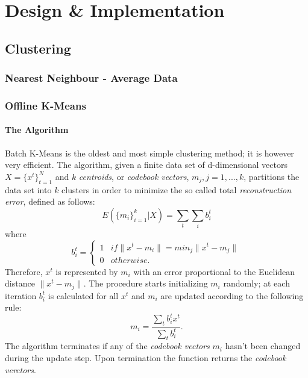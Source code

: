 \documentclass{lmproj}
\begin{document}
\chapter{Design \& Implementation}
\label{design}

\section{Clustering}

\subsection{Nearest Neighbour - Average Data}

\subsection{Offline K-Means}
\subsubsection{The Algorithm}
Batch K-Means is the oldest and most simple clustering method; it is however very efficient. The algorithm, given a finite data set of d-dimensional vectors $X=\{x^t\}_{t=1}^{N}$ and $k$ \textit{centroids}, or \textit{codebook vectors}, $m_j,j=1,...,k$, partitions the data set into $k$ clusters in order to minimize the so called total \textit{reconstruction error}, defined as follows:
\begin{equation}
E(\{m_i\}^k_{i=1}|X)=\underset{t}{\sum}\underset{i}{\sum}b_i^t
\end{equation}
where
\begin{equation}
b_i^t=
\begin{cases}
1 & if \parallel x^t -m_i \parallel = min_j \parallel x^t - m_j \parallel \\
0 & otherwise.
\end{cases}
\end{equation}
Therefore, $x^t$ is represented by $m_i$ with an error proportional to the Euclidean distance $\parallel x^t - m_j \parallel$. The procedure starts initializing $m_i$ randomly; at each iteration $b_i^t$ is calculated for all $x^t$ and $m_i$ are updated according to the following rule:
\begin{equation}
m_i=\dfrac{\sum_t b_i^t x^t}{\sum_t b_i^t}.
\end{equation}
The algorithm terminates if any of the \textit{codebook vectors} $m_i$ hasn't been changed during the update step. Upon termination the function returns the \textit{codebook verctors}\cite{Clustering}.
\end{document}
